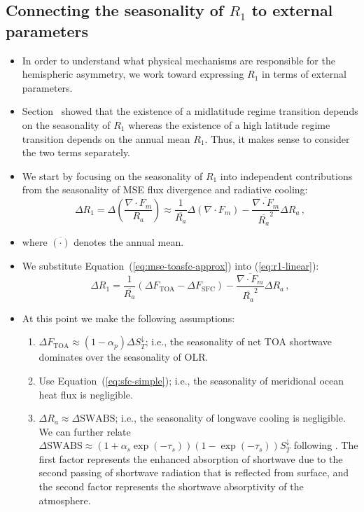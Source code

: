 \documentclass{ametsocV5}
\begin{document}
\subsection{Connecting the seasonality of \(R_{1}\) to external parameters}
\begin{itemize}
  \item In order to understand what physical mechanisms are responsible for the hemispheric asymmetry, we work toward expressing $R_{1}$ in terms of external parameters.
  \item Section~\label{subsec:asym} showed that the existence of a midlatitude regime transition depends on the seasonality of $R_{1}$ whereas the existence of a high latitude regime transition depends on the annual mean $R_{1}$. Thus, it makes sense to consider the two terms separately.
  \item We start by focusing on the seasonality of $R_{1}$ into independent contributions from the seasonality of MSE flux divergence and radiative cooling:
        \begin{equation} \label{eq:r1-linear}
          \Delta R_{1} = \Delta\left(\frac{\nabla\cdot F_{m}}{R_{a}}\right) \approx \frac{1}{\overline{R_{a}}}\Delta(\nabla\cdot F_{m}) - \frac{\overline{\nabla\cdot F_{m}}}{\overline{R_{a}}^{2}}\Delta R_{a} \, ,
        \end{equation}
  \item where $\overline{(\cdot)}$ denotes the annual mean.
  \item We substitute Equation~(\ref{eq:mse-toasfc-approx}) into (\ref{eq:r1-linear}):
        \begin{equation} \label{eq:r1-linear2}
          \Delta R_{1} = \frac{1}{\overline{R_{a}}}(\Delta F_{\mathrm{TOA}}-\Delta F_{{\mathrm{SFC}}}) - \frac{\overline{\nabla\cdot F_{m}}}{\overline{R_{a}}^{2}}\Delta R_{a} \, ,
        \end{equation}
  \item At this point we make the following assumptions:
        \begin{enumerate}
                \item $\Delta F_{\mathrm{TOA}} \approx (1-\alpha_{p})\Delta S_{T}^{\downarrow}$; i.e., the seasonality of net TOA shortwave dominates over the seasonality of OLR.
                \item Use Equation~(\ref{eq:sfc-simple}); i.e., the seasonality of meridional ocean heat flux is negligible.
                \item $\Delta R_{a}\approx \Delta \mathrm{SWABS}$; i.e., the seasonality of longwave cooling is negligible. We can further relate $\Delta \mathrm{SWABS}\approx (1+\alpha_{s}\exp(-\tau_{s}))(1-\exp(-\tau_{s}))S_{T}^{\downarrow}$ following \cite{shaw2020}. The first factor represents the enhanced absorption of shortwave due to the second passing of shortwave radiation that is reflected from surface, and the second factor represents the shortwave absorptivity of the atmosphere.

\end{enumerate}
\end{itemize}
\end{document}
